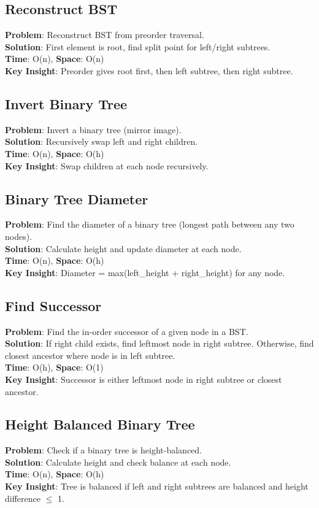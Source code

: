 \documentclass{report}
\begin{document}
\subsection{Reconstruct BST}
\textbf{Problem}: Reconstruct BST from preorder traversal.\\
\textbf{Solution}: First element is root, find split point for left/right subtrees.\\
\textbf{Time}: O(n), \textbf{Space}: O(n)\\
\textbf{Key Insight}: Preorder gives root first, then left subtree, then right subtree.

\subsection{Invert Binary Tree}
\textbf{Problem}: Invert a binary tree (mirror image).\\
\textbf{Solution}: Recursively swap left and right children.\\
\textbf{Time}: O(n), \textbf{Space}: O(h)\\
\textbf{Key Insight}: Swap children at each node recursively.

\subsection{Binary Tree Diameter}
\textbf{Problem}: Find the diameter of a binary tree (longest path between any two nodes).\\
\textbf{Solution}: Calculate height and update diameter at each node.\\
\textbf{Time}: O(n), \textbf{Space}: O(h)\\
\textbf{Key Insight}: Diameter = max(left\_height + right\_height) for any node.

\subsection{Find Successor}
\textbf{Problem}: Find the in-order successor of a given node in a BST.\\
\textbf{Solution}: If right child exists, find leftmost node in right subtree. Otherwise, find closest ancestor where node is in left subtree.\\
\textbf{Time}: O(h), \textbf{Space}: O(1)\\
\textbf{Key Insight}: Successor is either leftmost node in right subtree or closest ancestor.

\subsection{Height Balanced Binary Tree}
\textbf{Problem}: Check if a binary tree is height-balanced.\\
\textbf{Solution}: Calculate height and check balance at each node.\\
\textbf{Time}: O(n), \textbf{Space}: O(h)\\
\textbf{Key Insight}: Tree is balanced if left and right subtrees are balanced and height difference $\le$ 1.
\end{document}
